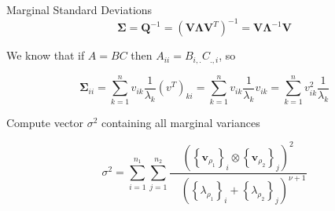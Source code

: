 \documentclass[
  ignorenonframetext,
]{beamer}
\begin{document}
\begin{frame}{Marginal Standard Deviations}
\label{marginal-standard-deviations}
\[
\boldsymbol \Sigma = \mathbf Q^{-1} = (\mathbf{V}\boldsymbol\Lambda\mathbf{V}^T)^{-1} = \mathbf{V}\boldsymbol \Lambda^{-1}\mathbf{V}
\]

We know that if \(A = BC\) then \(A_{ii} = B_{i, .} C_{., i}\), so

\[
\boldsymbol \Sigma_{ii} = \sum_{k=1}^{n} v_{ik} \frac{1}{\lambda_k} (v^T)_{ki} = \sum_{k=1}^{n} v_{ik} \frac{1}{\lambda_k} v_{ik} = \sum_{k=1}^{n} v_{ik}^2 \frac{1}{\lambda_k}
\]

Compute vector \(\sigma^2\) containing all marginal variances

\[ 
\sigma^2 = \sum_{i = 1}^{n_1} \sum_{j=1}^{n_2} \frac{\left(\left\{\mathbf{v}_{\rho_1}\right\}_i \otimes \left\{\mathbf{v}_{\rho_2}\right\}_j\right)^{2}}{\quad\left(\left\{\lambda_{\rho_1}\right\}_i + \left\{\lambda_{\rho_2}\right\}_j\right)^{\nu+1}}
\]
\end{frame}
\end{document}

